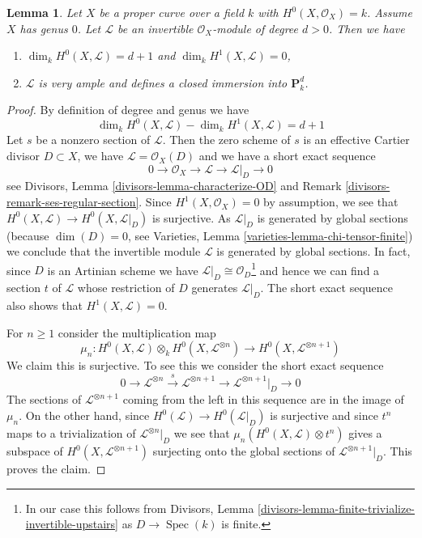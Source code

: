 \documentclass{stacks-project}
\theoremstyle{plain}
\newtheorem{lemma}[subsection]{Lemma}
\theoremstyle{definition}
\theoremstyle{remark}
\numberwithin{equation}{subsection}
\def\Spec{\mathop{\mathrm{Spec}}}
\begin{document}
\begin{lemma}
\label{lemma-genus-zero-positive-degree}
Let $X$ be a proper curve over a field $k$ with $H^0(X, \mathcal{O}_X) = k$.
Assume $X$ has genus $0$. Let $\mathcal{L}$ be an invertible
$\mathcal{O}_X$-module of degree $d > 0$. Then we have
\begin{enumerate}
\item $\dim_k H^0(X, \mathcal{L}) = d + 1$ and $\dim_k H^1(X, \mathcal{L}) = 0$,
\item $\mathcal{L}$ is very ample and defines a closed immersion into
$\mathbf{P}^d_k$.
\end{enumerate}
\end{lemma}

\begin{proof}
By definition of degree and genus we have
$$
\dim_k H^0(X, \mathcal{L}) - \dim_k H^1(X, \mathcal{L}) = d + 1
$$
Let $s$ be a nonzero section of $\mathcal{L}$.
Then the zero scheme of $s$ is an effective Cartier
divisor $D \subset X$, we have $\mathcal{L} = \mathcal{O}_X(D)$ and
we have a short exact sequence
$$
0 \to \mathcal{O}_X \to \mathcal{L} \to \mathcal{L}|_D \to 0
$$
see Divisors, Lemma \ref{divisors-lemma-characterize-OD} and
Remark \ref{divisors-remark-ses-regular-section}.
Since $H^1(X, \mathcal{O}_X) = 0$ by assumption, we see that
$H^0(X, \mathcal{L}) \to H^0(X, \mathcal{L}|_D)$ is surjective.
As $\mathcal{L}|_D$ is generated by global sections
(because $\dim(D) = 0$, see
Varieties, Lemma \ref{varieties-lemma-chi-tensor-finite})
we conclude that the invertible module $\mathcal{L}$
is generated by global sections.
In fact, since $D$ is an Artinian scheme we have
$\mathcal{L}|_D \cong \mathcal{O}_D$\footnote{In our case this
follows from Divisors, Lemma
\ref{divisors-lemma-finite-trivialize-invertible-upstairs}
as $D \to \Spec(k)$ is finite.} and hence we can
find a section $t$ of $\mathcal{L}$ whose restriction
of $D$ generates $\mathcal{L}|_D$.
The short exact sequence also shows that $H^1(X, \mathcal{L}) = 0$.

\medskip\noindent
For $n \geq 1$ consider the multiplication map
$$
\mu_n :
H^0(X, \mathcal{L}) \otimes_k H^0(X, \mathcal{L}^{\otimes n})
\longrightarrow
H^0(X, \mathcal{L}^{\otimes n + 1})
$$
We claim this is surjective. To see this we consider the short exact
sequence
$$
0 \to \mathcal{L}^{\otimes n} \xrightarrow{s}
\mathcal{L}^{\otimes n + 1} \to \mathcal{L}^{\otimes n + 1}|_D \to 0
$$
The sections of $\mathcal{L}^{\otimes n + 1}$ coming from the left in this
sequence are in the image of $\mu_n$. On the other hand, since
$H^0(\mathcal{L}) \to H^0(\mathcal{L}|_D)$ is surjective and since
$t^n$ maps to a trivialization of $\mathcal{L}^{\otimes n}|_D$
we see that $\mu_n(H^0(X, \mathcal{L}) \otimes t^n)$ gives a subspace
of $H^0(X, \mathcal{L}^{\otimes n + 1})$ surjecting onto the global sections of
$\mathcal{L}^{\otimes n + 1}|_D$. This proves the claim.


\end{proof}
\end{document}
